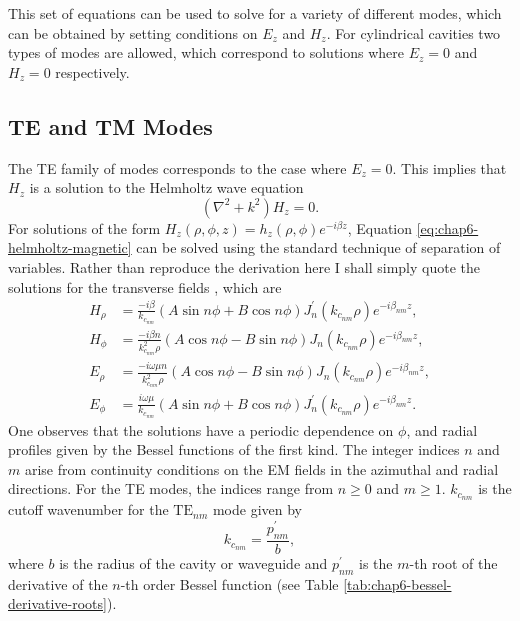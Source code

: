 This set of equations can be used to solve for a variety of different modes, which can be obtained by setting conditions on $E_z$ and $H_z$. For cylindrical cavities two types of modes are allowed, which correspond to solutions where $E_z=0$ and $H_z=0$ respectively. 

\subsection{TE and TM Modes}
\label{sec:chap6-TE-TM-modes}

The TE family of modes corresponds to the case where $E_z=0$. This implies that $H_z$ is a solution to the Helmholtz wave equation 
\begin{equation}
    (\nabla^2 + k^2)H_z = 0.
    \label{eq:chap6-helmholtz-magnetic}
\end{equation}
For solutions of the form $H_z(\rho,\phi,z)=h_z(\rho,\phi)e^{-i\beta z}$, Equation \ref{eq:chap6-helmholtz-magnetic} can be solved using the standard technique of separation of variables. Rather than reproduce the derivation here I shall simply quote the solutions for the transverse fields \cite{pozar}, which are 
\begin{align}
    H_\rho &= \frac{-i\beta }{k_{c_{nm}}}(A\sin{n\phi}+B\cos{n\phi})J_n^\prime(k_{c_{nm}}\rho)e^{-i\beta_{nm} z},\\
    H_\phi &=\frac{-i\beta n}{k_{c_{nm}}^2\rho}(A\cos{n\phi}-B\sin{n\phi})J_n(k_{c_{nm}}\rho)e^{-i\beta_{nm} z},\\
    E_\rho &=\frac{-i\omega\mu n}{k_{c_{nm}}^2 \rho}(A\cos{n\phi}-B\sin{n\phi})J_n(k_{c_{nm}}\rho)e^{-i\beta_{nm} z},\label{eq:chap6-erho-TE}\\
    E_\phi &=\frac{i\omega\mu}{k_{c_{nm}}}(A\sin{n\phi}+B\cos{n\phi})J_n^\prime(k_{c_{nm}}\rho)e^{-i\beta_{nm} z}\label{eq:chap6-ephi-TE}.
\end{align}
One observes that the solutions have a periodic dependence on $\phi$, and radial profiles given by the Bessel functions of the first kind. The integer indices $n$ and $m$ arise from continuity conditions on the EM fields in the azimuthal and radial directions. For the TE modes, the indices range from $n\geq0$ and $m\geq1$. $k_{c_{nm}}$ is the cutoff wavenumber for the $\mathrm{TE}_{nm}$ mode given by 
\begin{equation}
    k_{c_{nm}} = \frac{p^\prime_{nm}}{b},
\end{equation}
where $b$ is the radius of the cavity or waveguide and $p^\prime_{nm}$ is the $m$-th root of the derivative of the $n$-th order Bessel function (see Table \ref{tab:chap6-bessel-derivative-roots}).

